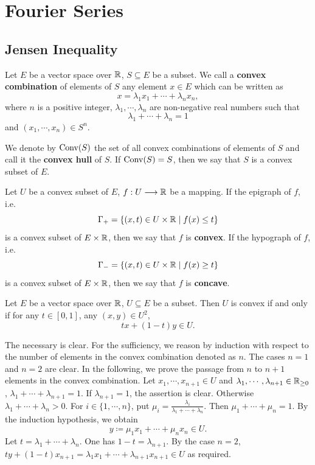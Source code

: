 \chapter{Fourier Series}

\section{Jensen Inequality}

\begin{definitionenv}
    Let $E$ be a vector space over $\mathbb{R}$, $S \subseteq E$ be a subset.
    We call a \textbf{convex combination} of elements of $S$ any element $x \in E$ which can be written as
    $$x = \lambda_1 x_1 + \cdots + \lambda_n x_n,$$
    where $n$ is a positive integer, $\lambda_1,\cdots,\lambda_n$ are non-negative real numbers such that
    $$\lambda_1 + \cdots + \lambda_n = 1$$
    and $(x_1,\cdots,x_n) \in S^n$.

    \quad We denote by $\operatorname{\mathrm{Conv}}(S)$ the set of all convex combinations of elements of $S$ and call it the \textbf{convex hull} of $S$.
    If $\operatorname{\mathrm{Conv}}(S) = S$, then we say that $S$ is a convex subset of $E$.

    \quad Let $U$ be a convex subset of $E$, $f : U \longrightarrow \mathbb{R}$ be a mapping.
    If the epigraph of $f$, i.e.
    $$\Gamma_{+} = \{(x,t) \in U \times \mathbb{R} \mid f(x) \le t\}$$
    is a convex subset of $E \times \mathbb{R}$, then we say that $f$ is \textbf{convex}.
    If the hypograph of $f$, i.e.
    $$\Gamma_{-} = \{(x,t) \in U \times \mathbb{R} \mid f(x) \ge t\}$$
    is a convex subset of $E \times \mathbb{R}$, then we say that $f$ is \textbf{concave}.
\end{definitionenv}

\begin{propositionenv}
    Let $E$ be a vector space over $\mathbb{R}$, $U \subseteq E$ be a subset.
    Then $U$ is convex if and only if for any $t \in [0,1]$, any $(x,y) \in U^2$,
    $$tx + (1-t)y \in U.$$
\end{propositionenv}
\begin{proofenv}
    The necessary is clear. For the sufficiency, we reason by induction with respect to the number of elements in the convex combination denoted as $n$.
    The cases $n=1$ and $n=2$ are clear.
    In the following, we prove the passage from $n$ to $n+1$ elements in the convex combination.
    Let $x_1,\cdots,x_{n+1} \in U$ and $\lambda_1,\cdots,\lambda_{n+1} \in \mathbb{R}_{\ge 0}$, $\lambda_1 + \cdots + \lambda_{n+1} = 1$.
    If $\lambda_{n+1}=1$, the assertion is clear. Otherwise $\lambda_1+\cdots+\lambda_n>0$.
    For $i \in \{1,\cdots,n\}$, put
    $\mu_i = \frac{\lambda_i}{\lambda_1 + \cdots + \lambda_n}$.
    Then $\mu_1 + \cdots + \mu_n = 1$.
    By the induction hypothesis, we obtain
    $$y \coloneq \mu_1 x_1 + \cdots + \mu_n x_n \in U.$$
    Let $t = \lambda_1 + \cdots + \lambda_n$.
    One has $1-t = \lambda_{n+1}$.
    By the case $n=2$, $ty + (1-t)x_{n+1} = \lambda_{1}x_1 + \cdots + \lambda_{n+1}x_{n+1} \in U$ as required.
\end{proofenv}

